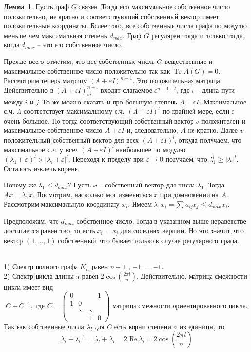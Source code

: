 \documentclass[10pt,a4paper,oneside]{book}
\theoremstyle{definition}
\newtheorem{lem}{{\color{green!50!black} Лемма}}
\renewcommand{\Re}{\operatorname{Re}}
\newcommand{\ovl}{\overline}
\newcommand{\Tr}{\operatorname{Tr}}
\def\exm{\noindent {\bf Примеры:}}
\def\eps{\varepsilon}
\def\lm{\begin{lem}}
\def\elm{\end{lem}}
\def\pmat{\begin{pmatrix}}
\def\epmat{\end{pmatrix}}
\begin{document}
\lm Пусть граф $G$ связен. Тогда его максимальное собственное число положительно, не кратно и соответствующий собственный вектор имеет положительные координаты. Более того, все собственные числа графа по модулю меньше чем максимальная степень $d_{max}$. Граф $G$ регулярен тогда и только тогда, когда $d_{max}$ -- это его собственное число.
\elm
\proof Прежде всего отметим, что все собственные числа $G$ вещественные и максимальное собственное число положительно так как $\Tr A(G)=0$. Рассмотрим теперь матрицу $(A+\eps I)^{n-1}$. Это положительная матрица. Действительно в $(A+\eps I)^{n-1}_{ij}$ входит слагаемое $\eps^{n-1-l}$, где $l$ -- длина пути между $i$ и $j$. То же можно сказать и про большую степень $A+\eps I$. Максимальное с.ч. $A$ соответствует максимальному с.ч. $(A+\eps I)^l$ по крайней мере, если $\eps$ очень большое. Но тогда соответствующий собственный вектор $v$ положителен и максимальное собственное число $A+\eps I$ и, следовательно, $A$ не кратно. Далее $v$ положительный собственный вектор для всех $(A+\eps I)^{l}$, откуда получаем, что максимальное с.ч. у всех $(A+\eps I)^{l}$ наибольшее по модулю $(\lambda_1+\eps)^l>|\lambda_i+\eps|^l$. Переходя к пределу при $\eps \to 0$ получаем, что $\lambda_1^l \geq |\lambda_i|^l$. Осталось извлечь корень.

Почему же $\lambda_1 \leq d_{max}$? Пусть $x$ -- собственный вектор для числа $\lambda_1$. Тогда $Ax=\lambda_1 x$. Посмотрим, насколько мог измениться $x$ при домножении на $A$. Рассмотрим максимальную координату $x_i$. Имеем $\lambda_1 x_i= \sum a_{ij}x_j\leq d_{max} x_i$.

Предположим, что $d_{max}$ собственное число. Тогда в указанном выше неравенстве достигается равенство, то есть $x_i=x_j$ для соседних вершин. Но это значит, что вектор $(1,\dots,1)$ собственный, что бывает только в случае регулярного графа. 
\endproof


\exm \\
1) Спектр полного графа $K_n$ равен $n-1$ , $-1, \dots,-1$.\\
2) Спектр цикла длины $n$ равен $2\cos(\frac{2\pi l}{n})$. Действительно, матрица смежности цикла имеет вид 
$$C + C^{-1}, \text{ где } C=\pmat 0 & && 1 \\  1 & 0 && \\ & \ddots & \ddots & \\ & &1&0 \epmat \text{ матрица смежности ориентированного цикла}. $$
Так как собственные числа $\lambda_l$ для $C$ есть корни степени $n$ из единицы, то 
$$\lambda_l+\lambda_l^{-1}= \lambda_l+\ovl{\lambda_l}= 2\Re \lambda_l =2\cos\left(\frac{2\pi l}{n}\right)$$
\end{document}
